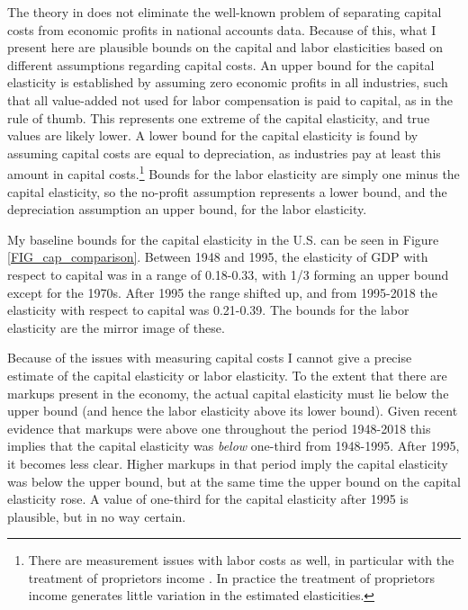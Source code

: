 \documentclass[11pt]{article}
\begin{document}
The theory in \cite{bfshortnote,bfprodge} does not eliminate the well-known problem of separating capital costs from economic profits in national accounts data. Because of this, what I present here are plausible bounds on the capital and labor elasticities based on different assumptions regarding capital costs. An upper bound for the capital elasticity is established by assuming zero economic profits in all industries, such that all value-added not used for labor compensation is paid to capital, as in the rule of thumb. This represents one extreme of the capital elasticity, and true values are likely lower. A lower bound for the capital elasticity is found by assuming capital costs are equal to depreciation, as industries pay at least this amount in capital costs.\footnote{There are measurement issues with labor costs as well, in particular with the treatment of proprietors income \citep{Gollin:2002zr,gommerupert2004,elsbyhs2013}. In practice the treatment of proprietors income generates little variation in the estimated elasticities.} Bounds for the labor elasticity are simply one minus the capital elasticity, so the no-profit assumption represents a lower bound, and the depreciation assumption an upper bound, for the labor elasticity. 

My baseline bounds for the capital elasticity in the U.S. can be seen in Figure \ref{FIG_cap_comparison}. Between 1948 and 1995, the elasticity of GDP with respect to capital was in a range of 0.18-0.33, with 1/3 forming an upper bound except for the 1970s. After 1995 the range shifted up, and from 1995-2018 the elasticity with respect to capital was 0.21-0.39. The bounds for the labor elasticity are the mirror image of these.

Because of the issues with measuring capital costs I cannot give a precise estimate of the capital elasticity or labor elasticity. To the extent that there are markups present in the economy, the actual capital elasticity must lie below the upper bound (and hence the labor elasticity above its lower bound). Given recent evidence that markups were above one throughout the period 1948-2018 \citep{Barkai000,edmondetal2018,NBERw23687,RePEc:nbr:nberwo:22897,basu2019} this implies that the capital elasticity was \textit{below} one-third from 1948-1995. After 1995, it becomes less clear. Higher markups in that period imply the capital elasticity was below the upper bound, but at the same time the upper bound on the capital elasticity rose. A value of one-third for the capital elasticity after 1995 is plausible, but in no way certain.
\end{document}
